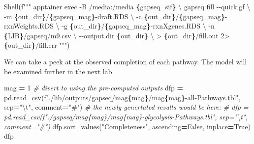 \documentclass[
]{book}
\newenvironment{Shaded}{\begin{snugshade}}{\end{snugshade}}
\newcommand{\CharTok}[1]{\textcolor[rgb]{0.31,0.60,0.02}{#1}}
\newcommand{\CommentTok}[1]{\textcolor[rgb]{0.56,0.35,0.01}{\textit{#1}}}
\newcommand{\DecValTok}[1]{\textcolor[rgb]{0.00,0.00,0.81}{#1}}
\newcommand{\NormalTok}[1]{#1}
\newcommand{\OperatorTok}[1]{\textcolor[rgb]{0.81,0.36,0.00}{\textbf{#1}}}
\newcommand{\SpecialCharTok}[1]{\textcolor[rgb]{0.81,0.36,0.00}{\textbf{#1}}}
\newcommand{\SpecialStringTok}[1]{\textcolor[rgb]{0.31,0.60,0.02}{#1}}
\newcommand{\StringTok}[1]{\textcolor[rgb]{0.31,0.60,0.02}{#1}}
\newcommand{\VariableTok}[1]{\textcolor[rgb]{0.00,0.00,0.00}{#1}}
\begin{document}
\begin{Shaded}
\begin{Highlighting}[numbers=left,,]
\NormalTok{Shell(}\SpecialStringTok{f"""}
\SpecialStringTok{apptainer exec {-}B /media:/media }\SpecialCharTok{\{}\NormalTok{gapseq\_sif}\SpecialCharTok{\}}\SpecialStringTok{ }\CharTok{\textbackslash{}}
\SpecialStringTok{    gapseq fill {-}{-}quick.gf }\CharTok{\textbackslash{}}
\SpecialStringTok{        {-}m }\SpecialCharTok{\{}\NormalTok{out\_dir}\SpecialCharTok{\}}\SpecialStringTok{/}\SpecialCharTok{\{}\NormalTok{gapseq\_mag}\SpecialCharTok{\}}\SpecialStringTok{{-}draft.RDS }\CharTok{\textbackslash{}}
\SpecialStringTok{        {-}c }\SpecialCharTok{\{}\NormalTok{out\_dir}\SpecialCharTok{\}}\SpecialStringTok{/}\SpecialCharTok{\{}\NormalTok{gapseq\_mag}\SpecialCharTok{\}}\SpecialStringTok{{-}rxnWeights.RDS }\CharTok{\textbackslash{}}
\SpecialStringTok{        {-}g }\SpecialCharTok{\{}\NormalTok{out\_dir}\SpecialCharTok{\}}\SpecialStringTok{/}\SpecialCharTok{\{}\NormalTok{gapseq\_mag}\SpecialCharTok{\}}\SpecialStringTok{{-}rxnXgenes.RDS }\CharTok{\textbackslash{}}
\SpecialStringTok{        {-}n }\SpecialCharTok{\{}\NormalTok{LIB}\SpecialCharTok{\}}\SpecialStringTok{/gapseq/m9.csv }\CharTok{\textbackslash{}}
\SpecialStringTok{        {-}{-}output.dir }\SpecialCharTok{\{}\NormalTok{out\_dir}\SpecialCharTok{\}}\SpecialStringTok{ }\CharTok{\textbackslash{}}
\SpecialStringTok{        \textgreater{} }\SpecialCharTok{\{}\NormalTok{out\_dir}\SpecialCharTok{\}}\SpecialStringTok{/fill.out 2\textgreater{} }\SpecialCharTok{\{}\NormalTok{out\_dir}\SpecialCharTok{\}}\SpecialStringTok{/fill.err}
\SpecialStringTok{"""}\NormalTok{)}
\end{Highlighting}
\end{Shaded}

We can take a peek at the observed completion of each pathway.
The model will be examined further in the next lab.

\begin{Shaded}
\begin{Highlighting}[numbers=left,,]
\NormalTok{mag }\OperatorTok{=} \DecValTok{1}
\CommentTok{\# divert to using the pre{-}computed outputs}
\NormalTok{dfp }\OperatorTok{=}\NormalTok{ pd.read\_csv(}\SpecialStringTok{f"./lib/outputs/gapseq/mag}\SpecialCharTok{\{}\NormalTok{mag}\SpecialCharTok{\}}\SpecialStringTok{/mag}\SpecialCharTok{\{}\NormalTok{mag}\SpecialCharTok{\}}\SpecialStringTok{{-}all{-}Pathways.tbl"}\NormalTok{, sep}\OperatorTok{=}\StringTok{"}\CharTok{\textbackslash{}t}\StringTok{"}\NormalTok{, comment}\OperatorTok{=}\StringTok{"\#"}\NormalTok{)}
\CommentTok{\# the newly genertated results would be here:}
\CommentTok{\# dfp = pd.read\_csv(f"./gapseq/mag\{mag\}/mag\{mag\}{-}glycolysis{-}Pathways.tbl", sep="\textbackslash{}t", comment="\#")}
\NormalTok{dfp.sort\_values(}\StringTok{"Completeness"}\NormalTok{, ascending}\OperatorTok{=}\VariableTok{False}\NormalTok{, inplace}\OperatorTok{=}\VariableTok{True}\NormalTok{)}
\NormalTok{dfp}
\end{Highlighting}
\end{Shaded}
\end{document}
